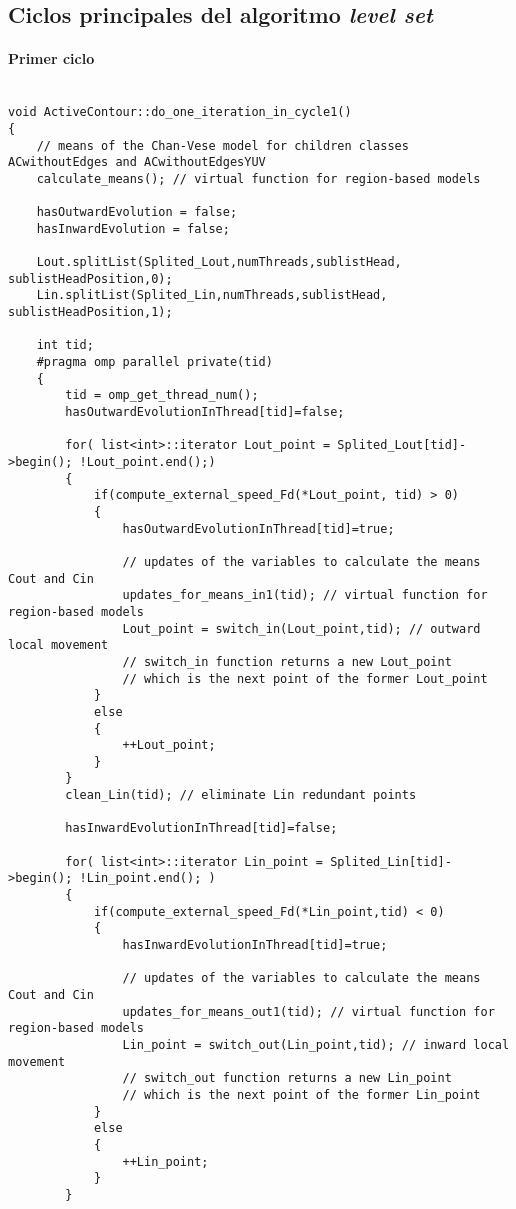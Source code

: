 \begin{appendices}

\chapter{Ciclos principales del algoritmo \textit{level set}}\label{apendice1}

\newpage

\subsubsection{Primer ciclo}
\begin{lstlisting}

void ActiveContour::do_one_iteration_in_cycle1()
{
	// means of the Chan-Vese model for children classes ACwithoutEdges and ACwithoutEdgesYUV
	calculate_means(); // virtual function for region-based models
	
	hasOutwardEvolution = false;
	hasInwardEvolution = false;
	
	Lout.splitList(Splited_Lout,numThreads,sublistHead, sublistHeadPosition,0);
	Lin.splitList(Splited_Lin,numThreads,sublistHead, sublistHeadPosition,1);
	
	int tid;
	#pragma omp parallel private(tid)
	{
		tid = omp_get_thread_num();
		hasOutwardEvolutionInThread[tid]=false;     
		
		for( list<int>::iterator Lout_point = Splited_Lout[tid]->begin(); !Lout_point.end();)
		{
			if(compute_external_speed_Fd(*Lout_point, tid) > 0)
			{
				hasOutwardEvolutionInThread[tid]=true;
			
				// updates of the variables to calculate the means Cout and Cin
				updates_for_means_in1(tid); // virtual function for region-based models
				Lout_point = switch_in(Lout_point,tid); // outward local movement
				// switch_in function returns a new Lout_point
				// which is the next point of the former Lout_point
			}
			else
			{
				++Lout_point;
			}
		}
		clean_Lin(tid); // eliminate Lin redundant points
		
		hasInwardEvolutionInThread[tid]=false;
		
		for( list<int>::iterator Lin_point = Splited_Lin[tid]->begin(); !Lin_point.end(); )
		{
			if(compute_external_speed_Fd(*Lin_point,tid) < 0)
			{
				hasInwardEvolutionInThread[tid]=true;
				
				// updates of the variables to calculate the means Cout and Cin
				updates_for_means_out1(tid); // virtual function for region-based models
				Lin_point = switch_out(Lin_point,tid); // inward local movement
				// switch_out function returns a new Lin_point
				// which is the next point of the former Lin_point
			}
			else
			{
				++Lin_point;
			}
		}
		

\end{lstlisting}
\end{appendices}
